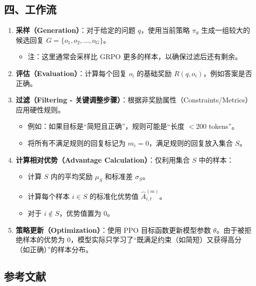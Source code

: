 \hypertarget{ux56dbux5de5ux4f5cux6d41}{%
\subsection{四、工作流}\label{ux56dbux5de5ux4f5cux6d41}}

\begin{enumerate}
\def\labelenumi{\arabic{enumi}.}
\tightlist
\item
  \textbf{采样（Generation）}：对于给定的问题 \(q\)，使用当前策略 \(\pi_\theta\) 生成一组较大的候选回复 \(G=\{o_1,o_2,\ldots,o_G\}\)。

  \begin{itemize}
  \tightlist
  \item
    注：这里通常会采样比 GRPO 更多的样本，以确保过滤后还有剩余。
  \end{itemize}
\item
  \textbf{评估（Evaluation）}：计算每个回复 \(o_i\) 的基础奖励 \(R(q,o_i)\)，例如答案是否正确。
\item
  \textbf{过滤（Filtering - 关键调整步骤）}：根据非奖励属性（Constraints/Metrics）应用硬性规则。

  \begin{itemize}
  \tightlist
  \item
    例如：如果目标是``简短且正确''，规则可能是``长度 \(<200\) tokens''。
  \item
    将所有不满足规则的回复标记为 \(m_i=0\)，满足规则的回复放入集合 \(S\)。
  \end{itemize}
\item
  \textbf{计算相对优势（Advantage Calculation）}：仅利用集合 \(S\) 中的样本：

  \begin{itemize}
  \tightlist
  \item
    计算 \(S\) 内的平均奖励 \(\mu_S\) 和标准差 \(\sigma_S\)。
  \item
    计算每个样本 \(i \in S\) 的标准化优势值 \(\hat{A}_{i,t}^{(m)}\)。
  \item
    对于 \(i \notin S\)，优势值置为 \(0\)。
  \end{itemize}
\item
  \textbf{策略更新（Optimization）}：使用 PPO 目标函数更新模型参数 \(\theta\)。由于被拒绝样本的优势为 \(0\)，模型实际只学习了``既满足约束（如简短）又获得高分（如正确）''的样本分布。
\end{enumerate}

\hypertarget{ux53c2ux8003ux6587ux732e-110}{%
\subsection{参考文献}\label{ux53c2ux8003ux6587ux732e-110}}

